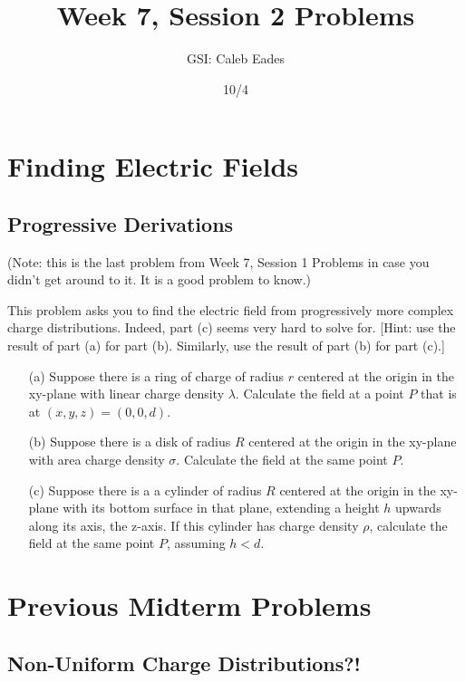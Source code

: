 \documentclass{article}
\begin{document}
\title{Week 7, Session 2 Problems}
\author{GSI: Caleb Eades}
\date{10/4}
\maketitle

\section{Finding Electric Fields}

\subsection{Progressive Derivations}

(Note: this is the last problem from Week 7, Session 1 Problems in case you didn't get around to it. It is a good problem to know.)

This problem asks you to find the electric field from progressively more complex charge distributions. Indeed, part (c) seems very hard to solve for. [Hint: use the result of part (a) for part (b). Similarly, use the result of part (b) for part (c).]
\begin{itemize}
	\item[(a)] Suppose there is a ring of charge of radius $r$ centered at the origin in the xy-plane with linear charge density $\lambda$. Calculate the field at a point $P$ that is at $(x,y,z)=(0,0,d)$.
	\item[(b)] Suppose there is a disk of radius $R$ centered at the origin in the xy-plane with area charge density $\sigma$. Calculate the field at the same point $P$.
	\item[(c)] Suppose there is a a cylinder of radius $R$ centered at the origin in the xy-plane with its bottom surface in that plane, extending a height $h$ upwards along its axis, the z-axis. If this cylinder has charge density $\rho$, calculate the field at the same point $P$, assuming $h<d$.
\end{itemize}

\section{Previous Midterm Problems}

\subsection{Non-Uniform Charge Distributions?!}
\end{document}
